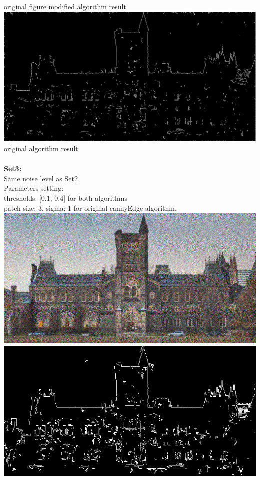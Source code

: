 \documentclass[10pt,twocolumn,letterpaper]{article}
\begin{document}
original figure \hspace{45pt} modified algorithm result\\
\includegraphics[scale=0.1]{result_original_noise_60.png}\\
original algorithm result\\
\\
\textbf{Set3:}\\
Same noise level as Set2\\
Parameters setting:\\
thresholds: [0.1, 0.4] for both algorithms\\
patch size: 3, sigma: 1 for original cannyEdge algorithm.\\
\includegraphics[scale=0.1]{UofT-noise-60.png}
\includegraphics[scale=0.2]{pyramid_edge_noise_60_3.png}\\
\end{document}
